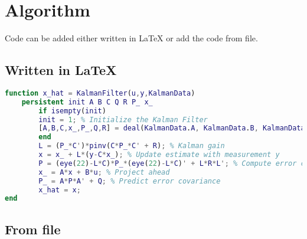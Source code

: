 \chapter{Algorithm}
Code can be added either written in \LaTeX{} or add the code from file.

\section{Written in \LaTeX}
\begin{lstlisting}[caption=MATLAB function Kalman filter,language=matlab,label=DKF algo]
function x_hat = KalmanFilter(u,y,KalmanData)
	persistent init A B C Q R P_ x_
		if isempty(init)
		init = 1; % Initialize the Kalman Filter
		[A,B,C,x_,P_,Q,R] = deal(KalmanData.A, KalmanData.B, KalmanData.C, KalmanData.x, KalmanData.P, KalmanData.Q, KalmanData.R);
		end
		L = (P_*C')*pinv(C*P_*C' + R); % Kalman gain
		x = x_ + L*(y-C*x_); % Update estimate with measurement y
		P = (eye(22)-L*C)*P_*(eye(22)-L*C)' + L*R*L'; % Compute error covariance for updated estimate
		x_ = A*x + B*u; % Project ahead
		P_ = A*P*A' + Q; % Predict error covariance
		x_hat = x;
end
\end{lstlisting}

\newpage
\section{From file}
